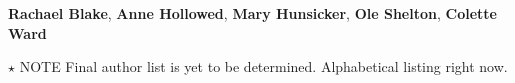 \textbf{Rachael Blake}, 
\textbf{Anne Hollowed}, 
\textbf{Mary Hunsicker}, 
\textbf{Ole Shelton}, 
\textbf{Colette Ward}

$\star$ NOTE Final author list is yet to be determined. Alphabetical listing right now. 
